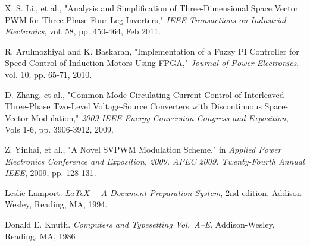 \documentclass{iaesarticle3ol}
\begin{document}




%



 \begin{thebibliography}{4}


  X. S. Li., et al., "Analysis and Simplification of Three-Dimensional Space Vector PWM for Three-Phase Four-Leg Inverters," \textsl{IEEE Transactions on Industrial Electronics}, vol. 58, pp. 450-464, Feb 2011.

 	R. Arulmozhiyal and K. Baskaran, "Implementation of a Fuzzy PI Controller for Speed Control of Induction Motors Using FPGA," \textsl{Journal of Power Electronics}, vol. 10, pp. 65-71, 2010.

  D. Zhang, et al., "Common Mode Circulating Current Control of Interleaved Three-Phase Two-Level Voltage-Source Converters with Discontinuous Space-Vector Modulation," \textsl{2009 IEEE Energy Conversion Congress and Exposition}, Vols 1-6, pp. 3906-3912, 2009.

 	Z. Yinhai, et al., "A Novel SVPWM Modulation Scheme," in \textsl{Applied Power Electronics Conference and Exposition, 2009. APEC 2009. Twenty-Fourth Annual IEEE}, 2009, pp. 128-131.
 
  Leslie Lamport. \textsl{\LaTeX\ -- A Document Preparation System}, 2nd edition. Addison-Wesley, Reading, MA, 1994.
 
  Donald E. Knuth. \textsl{Computers and Typesetting Vol.\ A--E}. Addison-Wesley, Reading, MA, 1986

 \end{thebibliography}
\end{document}
